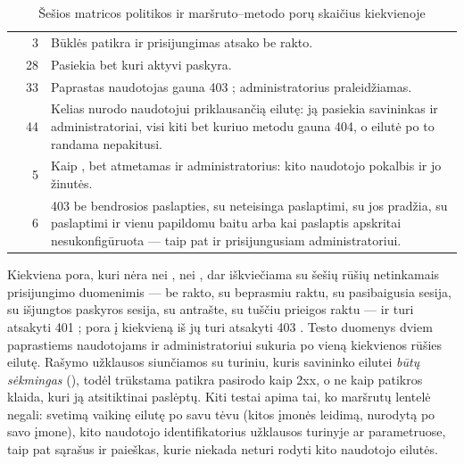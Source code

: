 \begin{table}[H]
\caption{Šešios matricos politikos ir maršruto--metodo porų skaičius kiekvienoje}\label{tab:security:policies}
\begin{tabularx}{\textwidth}{@{}L{22mm}rY@{}}
\toprule
{} &  &  \\
\midrule
{} & 3 & Būklės patikra ir prisijungimas atsako be rakto. \\
 & 28 & Pasiekia bet kuri aktyvi paskyra. \\
 & 33 & Paprastas naudotojas gauna 403 ; administratorius praleidžiamas. \\
 & 44 & Kelias nurodo naudotojui priklausančią eilutę: ją pasiekia savininkas ir administratoriai, visi kiti bet kuriuo metodu gauna 404, o eilutė po to randama nepakitusi. \\
 & 5 & Kaip , bet atmetamas ir administratorius: kito naudotojo pokalbis ir jo žinutės. \\
 & 6 & 403  be bendrosios paslapties, su neteisinga paslaptimi, su jos pradžia, su paslaptimi ir vienu papildomu baitu arba kai paslaptis apskritai nesukonfigūruota --- taip pat ir prisijungusiam administratoriui. \\
\bottomrule
\end{tabularx}
\end{table}

Kiekviena pora, kuri nėra nei , nei , dar iškviečiama su šešių
rūšių netinkamais prisijungimo duomenimis --- be rakto, su beprasmiu raktu, su pasibaigusia
sesija, su išjungtos paskyros sesija, su  antrašte, su tuščiu prieigos raktu --- ir
turi atsakyti 401 ;  pora į kiekvieną iš jų turi atsakyti
403 . Testo duomenys dviem paprastiems naudotojams ir administratoriui
sukuria po vieną kiekvienos rūšies eilutę. Rašymo užklausos siunčiamos su turiniu, kuris
savininko eilutei \emph{būtų sėkmingas} (), todėl trūkstama patikra
pasirodo kaip 2xx, o ne kaip patikros klaida, kuri ją atsitiktinai paslėptų. Kiti testai
apima tai, ko maršrutų lentelė negali: svetimą vaikinę eilutę po savu tėvu (kitos įmonės
leidimą, nurodytą po savo įmone), kito naudotojo identifikatorius užklausos turinyje ar
parametruose, taip pat sąrašus ir paieškas, kurie niekada neturi rodyti kito naudotojo
eilutės.


